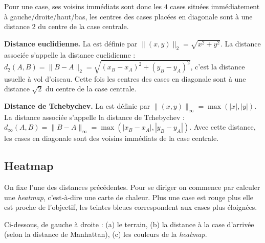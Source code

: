 \documentclass[11pt,class=report,crop=false]{standalone}
\begin{document}
Pour une case, ses voisins immédiats sont donc les $4$ cases situées immédiatement à gauche/droite/haut/bas, les centres des cases placées en diagonale sont à une distance $2$ du centre de la case centrale.




\bigskip

\textbf{Distance euclidienne.}
La  est définie par $\| (x,y) \|_2 = \sqrt{ x^2 + y^2}$.
La distance associée s'appelle la distance euclidienne :
$d_2(A,B) = \| B - A \|_2 = \sqrt{ (x_B-x_A)^2 + (y_B-y_A)^2}$,
c'est la distance usuelle \og{}à vol d'oiseau\fg{}.
Cette fois les centres des cases en diagonale sont à une distance $\sqrt2$ du centre de la case centrale.


\bigskip

\textbf{Distance de Tchebychev.}
La  est définie par $\| (x,y) \|_\infty = \max( |x|, |y| )$.
La distance associée s'appelle la distance de Tchebychev :
$d_\infty(A,B) = \| B - A \|_{\infty} = \max( |x_B-x_A|, |y_B-y_A|)$.
Avec cette distance, les cases en diagonale sont des voisins immédiats de la case centrale.


\subsection{Heatmap}

On fixe l'une des distances précédentes.
Pour se diriger on commence par calculer une \emph{heatmap}, c'est-à-dire une carte de chaleur. Plus une case est rouge plus elle est proche de l'objectif, les teintes bleues correspondent aux cases plus éloignées.

Ci-dessous, de gauche à droite : (a) le terrain, (b) la distance à la case d'arrivée (selon la distance de Manhattan), (c) les couleurs de la \emph{heatmap}.
\end{document}
